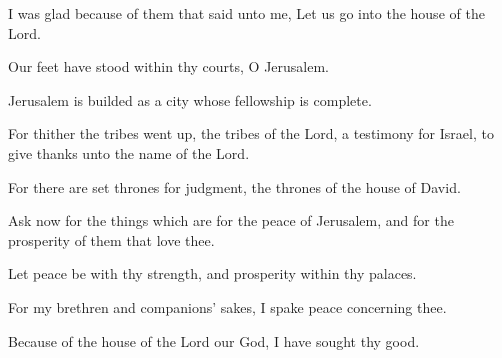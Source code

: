 I was glad because of them that said unto me, Let us go into the house of the Lord.

Our feet have stood within thy courts, O Jerusalem.

Jerusalem is builded as a city whose fellowship is complete.

For thither the tribes went up, the tribes of the Lord, a testimony for Israel, to give thanks unto the name of the Lord.

For there are set thrones for judgment, the thrones of the house of David.

Ask now for the things which are for the peace of Jerusalem, and for the prosperity of them that love thee.

Let peace be with thy strength, and prosperity within thy palaces.

For my brethren and companions’ sakes, I spake peace concerning thee.

Because of the house of the Lord our God, I have sought thy good.
